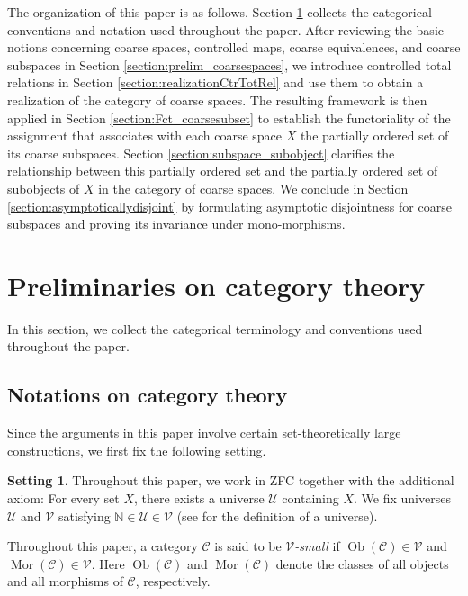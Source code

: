\documentclass[12pt, a4paper]{amsart}
\theoremstyle{definition}
\newtheorem{setting}[theorem]{Setting}
\newcommand{\Mor}{\mathop{\mathrm{Mor}}\nolimits}
\newcommand{\Ob}{\mathop{\mathrm{Ob}}\nolimits}
\begin{document}
The organization of this paper is as follows.
Section \ref{section:category} collects the categorical conventions and notation used throughout the paper.
After reviewing the basic notions concerning coarse spaces, controlled maps, coarse equivalences, and coarse subspaces in Section \ref{section:prelim_coarsespaces}, we introduce controlled total relations in Section \ref{section:realizationCtrTotRel} and use them to obtain a realization of the category of coarse spaces.
The resulting framework is then applied in Section \ref{section:Fct_coarsesubset} to establish the functoriality of the assignment that associates with each coarse space $X$ the partially ordered set of its coarse subspaces.
Section \ref{section:subspace_subobject} clarifies the relationship between this partially ordered set and the partially ordered set of subobjects of $X$ in the category of coarse spaces.
We conclude in Section \ref{section:asymptoticallydisjoint} by formulating asymptotic disjointness for coarse subspaces and proving its invariance under mono-morphisms.




\section{Preliminaries on category theory}\label{section:category}

In this section, we collect the categorical terminology and conventions used
throughout the paper.

\subsection{Notations on category theory}

Since the arguments in this paper involve certain set-theoretically large
constructions, we first fix the following setting.

\begin{setting}\label{setting:UVC}
Throughout this paper, we work in ZFC together with the additional axiom:
For every set $X$, there exists a universe $\mathcal U$ containing $X$.
We fix universes $\mathcal U$ and $\mathcal{V}$ satisfying
$\mathbb N\in\mathcal U\in\mathcal{V}$
(see \cite[Expos\'e I]{SGA41} for the definition of a universe).
\end{setting}

Throughout this paper, a category $\mathcal{C}$ is said to be
\emph{$\mathcal{V}$-small} if
$\Ob(\mathcal{C})\in\mathcal{V}$ and
$\Mor(\mathcal{C})\in\mathcal{V}$.
Here $\Ob(\mathcal{C})$ and $\Mor(\mathcal{C})$ denote the classes of all
objects and all morphisms of $\mathcal{C}$, respectively.
\end{document}
